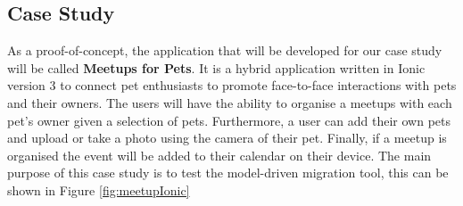 \documentclass[conference]{IEEEtran}
\begin{document}
\subsection{Case Study}
As a proof-of-concept, the application that will be developed for our case study will be called \textbf{Meetups for Pets}. It is a hybrid application written
in Ionic version 3 to connect pet enthusiasts to promote face-to-face interactions with pets and their owners. The users will have the ability to organise a
meetups with each pet’s owner given a selection of pets. Furthermore, a user can add their own pets and upload or take a photo using the camera of their pet. Finally,
if a meetup is organised the event will be added to their calendar on their device. The main purpose of this case study is to test the model-driven migration tool, this can be shown in Figure \ref{fig:meetupIonic}
\end{document}
